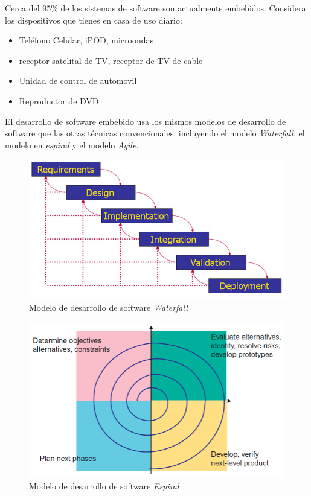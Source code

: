 \documentclass[12pt,twoside]{book}
\begin{document}
Cerca del 95\% de los sistemas de software son actualmente embebidos. Considera los dispositivos que tienes en casa de uso diario:

\begin{itemize}
	\item Teléfono Celular, iPOD, microondas
	\item receptor satelital de TV, receptor de TV de cable
	\item Unidad de control de automovil
	\item Reproductor de DVD
\end{itemize}

El desarrollo de software embebido usa los mismos modelos de desarrollo de software que las otras técnicas convencionales, incluyendo el modelo \textit{Waterfall}, el modelo en \textit{espiral} y el modelo \textit{Agile}.

\begin{figure}
	\centering
	\includegraphics[width=0.9\linewidth]{waterfall.png}
	\caption{Modelo de desarrollo de software \textit{Waterfall}}
	\label{fig0001}
\end{figure}

\begin{figure}
	\centering
	\includegraphics[width=0.9\linewidth]{espiral.png}
	\caption{Modelo de desarrollo de software \textit{Espiral}}
	\label{fig0002}
\end{figure}
\end{document}
